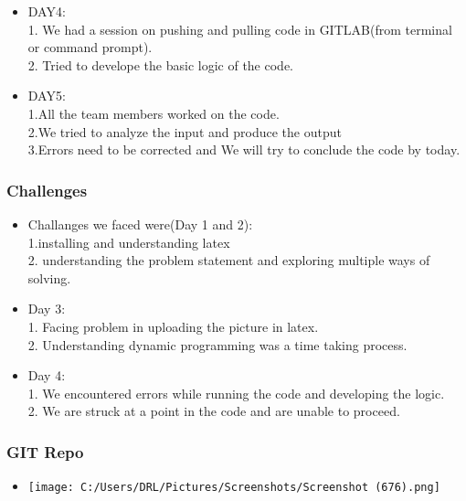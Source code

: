 \documentclass[14pt]{beamer}
\begin{document}
\begin{frame}
\begin{itemize}
      \item DAY4: \\ 1. We had a session on pushing and pulling code in GITLAB(from terminal or command prompt). \\ 2. Tried to develope the basic logic of the code. 
\end{itemize}
\end{frame} 
\begin{frame}
\begin{itemize}
      \item DAY5:\\1.All the team members worked on the code.\\2.We tried to analyze the input and produce the output \\3.Errors need to be corrected and We will try to conclude the code by today.
      \end{itemize}
      \end{frame}
    \begin{frame}
	\frametitle{Challenges}
        \begin{itemize}
	    \item Challanges we faced were(Day 1 and 2): \\1.installing and understanding latex \\2. understanding the problem statement and exploring multiple ways of solving.
	    \item Day 3: \\ 1. Facing problem in uploading the picture in latex. \\ 2. Understanding dynamic programming was a time taking process.
        \end{itemize}
   \end{frame}
   \begin{frame}
   \begin{itemize}
        \item Day 4: \\ 1. We encountered errors while running the code and developing the logic. \\ 2. We are struck at a point in the code and are unable to proceed. 
   
   \end{itemize}
   \end{frame}
    \begin{frame}
	\frametitle{GIT Repo}
	\begin{itemize}
     \item {\texttt{[image: C:/Users/DRL/Pictures/Screenshots/Screenshot (676).png]}}
	\end{itemize}
    \end{frame}
\end{document}
